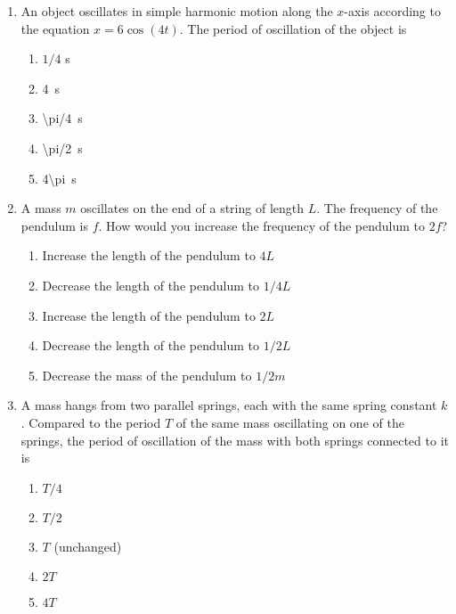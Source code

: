 \documentclass{../../oss-apphys}
\begin{document}
\begin{multicols}{2}
\begin{enumerate}[leftmargin=18pt]
    \columnbreak
    
  \item An object oscillates in simple harmonic motion along the $x$-axis
    according to the equation $x=6 \cos(4t)$. The period of oscillation of the
    object is
    \begin{enumerate}[noitemsep,topsep=0pt,leftmargin=18pt,label=(\Alph*)]
    \item $1/4$ \si{\second}
    \item\SI{4}{\second}
    \item\SI{\pi/4}{\second}
    \item\SI{\pi/2}{\second}
    \item\SI{4\pi}{\second}
    \end{enumerate}    

  \item A mass $m$ oscillates on the end of a string of length $L$. The
    frequency of the pendulum is $f$. How would you increase the frequency of
    the pendulum to $2f$?
    \begin{enumerate}[noitemsep,topsep=0pt,leftmargin=18pt,label=(\Alph*)]
    \item Increase the length of the pendulum to $4L$
    \item Decrease the length of the pendulum to $1/4L$
    \item Increase the length of the pendulum to $2L$
    \item Decrease the length of the pendulum to $1/2L$
    \item Decrease the mass of the pendulum to $1/2m$
    \end{enumerate}

  \item A mass hangs from two parallel springs, each with the same spring
    constant $k$. Compared to the period $T$ of the same mass oscillating on
    one of the springs, the period of oscillation of the mass with both
    springs connected to it is
    \begin{center}
    \end{center}
    \begin{enumerate}[noitemsep,topsep=0pt,leftmargin=18pt,label=(\Alph*)]
    \item $T/4$
    \item $T/2$
    \item $T$ (unchanged)
    \item $2T$
    \item $4T$
    \end{enumerate}


\end{enumerate}
\end{multicols}
\end{document}
